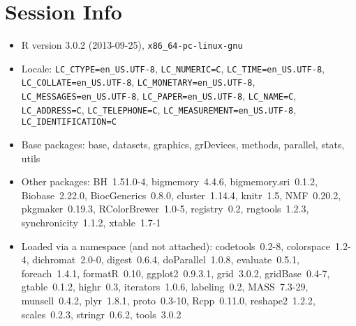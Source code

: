 \documentclass[a4paper]{article}\usepackage[]{graphicx}\usepackage[]{color}
\begin{document}
\section{Session Info}
\begin{itemize}\raggedright
  \item R version 3.0.2 (2013-09-25), \verb|x86_64-pc-linux-gnu|
  \item Locale: \verb|LC_CTYPE=en_US.UTF-8|, \verb|LC_NUMERIC=C|, \verb|LC_TIME=en_US.UTF-8|, \verb|LC_COLLATE=en_US.UTF-8|, \verb|LC_MONETARY=en_US.UTF-8|, \verb|LC_MESSAGES=en_US.UTF-8|, \verb|LC_PAPER=en_US.UTF-8|, \verb|LC_NAME=C|, \verb|LC_ADDRESS=C|, \verb|LC_TELEPHONE=C|, \verb|LC_MEASUREMENT=en_US.UTF-8|, \verb|LC_IDENTIFICATION=C|
  \item Base packages: base, datasets, graphics, grDevices,
    methods, parallel, stats, utils
  \item Other packages: BH~1.51.0-4, bigmemory~4.4.6,
    bigmemory.sri~0.1.2, Biobase~2.22.0, BiocGenerics~0.8.0,
    cluster~1.14.4, knitr~1.5, NMF~0.20.2, pkgmaker~0.19.3,
    RColorBrewer~1.0-5, registry~0.2, rngtools~1.2.3,
    synchronicity~1.1.2, xtable~1.7-1
  \item Loaded via a namespace (and not attached):
    codetools~0.2-8, colorspace~1.2-4, dichromat~2.0-0,
    digest~0.6.4, doParallel~1.0.8, evaluate~0.5.1, foreach~1.4.1,
    formatR~0.10, ggplot2~0.9.3.1, grid~3.0.2, gridBase~0.4-7,
    gtable~0.1.2, highr~0.3, iterators~1.0.6, labeling~0.2,
    MASS~7.3-29, munsell~0.4.2, plyr~1.8.1, proto~0.3-10,
    Rcpp~0.11.0, reshape2~1.2.2, scales~0.2.3, stringr~0.6.2,
    tools~3.0.2
\end{itemize}



\printbibliography[heading=bibintoc]
\end{document}
